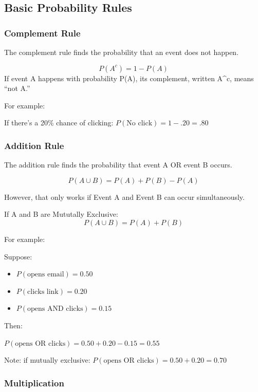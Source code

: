 \documentclass[
  letterpaper,
  DIV=11,
  numbers=noendperiod]{scrreprt}
\providecommand{\tightlist}{%
  \setlength{\itemsep}{0pt}\setlength{\parskip}{0pt}}
\begin{document}
\subsection{Basic Probability Rules}\label{basic-probability-rules}

\subsubsection{Complement Rule}\label{complement-rule}

The complement rule finds the probability that an event does not happen.

\[
P(A^c)=1-P(A)
\] If event A happens with probability P(A), its complement, written
A\^{}c, means ``not A.''

For example:

If there's a 20\% chance of clicking: \(P(\text{No click})=1-.20=.80\)

\subsubsection{Addition Rule}\label{addition-rule}

The addition rule finds the probability that event A OR event B occurs.

\[P(A\cup B)=P(A)+P(B) - P(A)\]

However, that only works if Event A and Event B can occur
simultaneously.

If A and B are Mututally Exclusive: \[P(A\cup B)=P(A)+P(B)\]

For example:

Suppose:

\begin{itemize}
\tightlist
\item
  \(P(\text{opens email})=0.50\)
\item
  \(P(\text{clicks link})=0.20\)
\item
  \(P(\text{opens AND clicks})=0.15\)
\end{itemize}

Then:

\(P(\text{opens OR clicks})=0.50+0.20-0.15=0.55\)

Note: if mutually exclusive:
\(P(\text{opens OR clicks})=0.50+0.20=0.70\)

\subsubsection{Multiplication}\label{multiplication}
\end{document}

